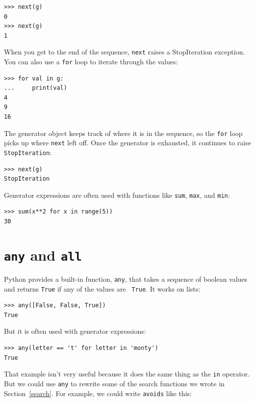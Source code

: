 \documentclass[10pt]{book}
\begin{document}
\begin{verbatim}
>>> next(g)
0
>>> next(g)
1
\end{verbatim}
%
When you get to the end of the sequence, {\tt next} raises a 
StopIteration exception.  You can also use a {\tt for} loop to iterate
through the values:

\begin{verbatim}
>>> for val in g:
...     print(val)
4
9
16
\end{verbatim}
%
The generator object keeps track of where it is in the sequence,
so the {\tt for} loop picks up where {\tt next} left off.  Once the
generator is exhausted, it continues to raise {\tt StopIteration}:

\begin{verbatim}
>>> next(g)
StopIteration
\end{verbatim}

Generator expressions are often used with functions like {\tt sum},
{\tt max}, and {\tt min}:

\begin{verbatim}
>>> sum(x**2 for x in range(5))
30
\end{verbatim}


\section{{\tt any} and {\tt all}}

Python provides a built-in function, {\tt any}, that takes a sequence
of boolean values and returns {\tt True} if any of the values are {\tt
  True}.  It works on lists:

\begin{verbatim}
>>> any([False, False, True])
True
\end{verbatim}
%
But it is often used with generator expressions:

\begin{verbatim}
>>> any(letter == 't' for letter in 'monty')
True
\end{verbatim}
%
That example isn't very useful because it does the same thing
as the {\tt in} operator.  But we could use {\tt any} to rewrite
some of the search functions we wrote in Section~\ref{search}.  For
example, we could write {\tt avoids} like this:
\end{document}
